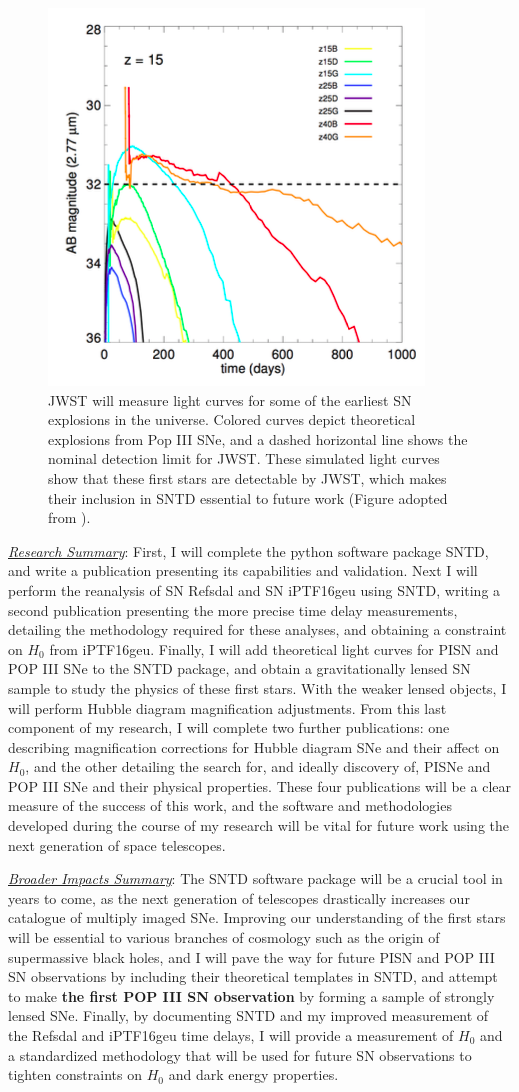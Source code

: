 \begin{figure}
\centering
\includegraphics[height=.35\textwidth]{FIG/JWST_high_z}
\caption{
JWST will measure light curves for some of the earliest SN explosions
in the universe. Colored curves depict theoretical explosions from Pop
III SNe, and a dashed horizontal line shows the nominal detection
limit for JWST. These simulated light curves show that these first
stars are detectable by JWST, which makes their inclusion in SNTD
essential to future work (Figure adopted from \citet{Whalen:2013}).}
\end{figure}

\noindent\underline{\textit{Research Summary}}:
First, I will complete the python software package SNTD, and write a
publication presenting its capabilities and validation. Next I will
perform the reanalysis of SN Refsdal and SN iPTF16geu using SNTD,
writing a second publication presenting the more precise time delay
measurements, detailing the methodology required for these analyses,
and obtaining a constraint on $H_0$ from iPTF16geu. Finally, I will
add theoretical light curves for PISN and POP III SNe to the SNTD
package, and obtain a gravitationally lensed SN sample to study the
physics of these first stars. With the weaker lensed objects, I will
perform Hubble diagram magnification adjustments. From this last
component of my research, I will complete two further publications:
one describing magnification corrections for Hubble diagram SNe and
their affect on $H_0$, and the other detailing the search for, and
ideally discovery of, PISNe and POP III SNe and their physical
properties. These four publications will be a clear measure of the
success of this work, and the software and methodologies developed
during the course of my research will be vital for future work
using the next generation of space telescopes.

\noindent\underline{\textit{Broader Impacts Summary}}:
The SNTD software package will be a crucial tool in years to come, as
the next generation of telescopes drastically increases our catalogue
of multiply imaged SNe. Improving our understanding of the first stars
will be essential to various branches of cosmology such as the origin
of supermassive black holes, and I will pave the way for future PISN
and POP III SN observations by including their theoretical templates
in SNTD, and attempt to make \textbf{the first POP III SN observation}
by forming a sample of strongly lensed SNe. Finally, by documenting
SNTD and my improved measurement of the Refsdal and iPTF16geu time
delays, I will provide a measurement of $H_0$ and a standardized
methodology that will be used for future SN observations to tighten
constraints on $H_0$ and dark energy properties.

